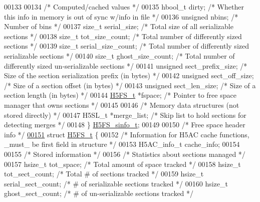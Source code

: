 \begin{DoxyCode}
00133 
00134 \textcolor{comment}{/* Computed/cached values */}
00135     hbool\_t dirty;              \textcolor{comment}{/* Whether this info in memory is out of sync w/info in file */}
00136     \textcolor{keywordtype}{unsigned} nbins;             \textcolor{comment}{/* Number of bins                             */}
00137     \textcolor{keywordtype}{size\_t} serial\_size;         \textcolor{comment}{/* Total size of all serializable sections    */}
00138     \textcolor{keywordtype}{size\_t} tot\_size\_count;      \textcolor{comment}{/* Total number of differently sized sections */}
00139     \textcolor{keywordtype}{size\_t} serial\_size\_count;   \textcolor{comment}{/* Total number of differently sized serializable sections */}
00140     \textcolor{keywordtype}{size\_t} ghost\_size\_count;    \textcolor{comment}{/* Total number of differently sized un-serializable sections */}
00141     \textcolor{keywordtype}{unsigned} sect\_prefix\_size;  \textcolor{comment}{/* Size of the section serialization prefix (in bytes) */}
00142     \textcolor{keywordtype}{unsigned} sect\_off\_size;     \textcolor{comment}{/* Size of a section offset (in bytes)        */}
00143     \textcolor{keywordtype}{unsigned} sect\_len\_size;     \textcolor{comment}{/* Size of a section length (in bytes)        */}
00144     \hyperlink{struct_h5_f_s__t}{H5FS\_t} *fspace;             \textcolor{comment}{/* Pointer to free space manager that owns sections */}
00145 
00146 \textcolor{comment}{/* Memory data structures (not stored directly) */}
00147     H5SL\_t *merge\_list;         \textcolor{comment}{/* Skip list to hold sections for detecting merges */}
00148 \} \hyperlink{struct_h5_f_s__sinfo__t}{H5FS\_sinfo\_t};
00149 
00150 \textcolor{comment}{/* Free space header info */}
\hyperlink{struct_h5_f_s__t}{00151} \textcolor{keyword}{struct }\hyperlink{struct_h5_f_s__t}{H5FS\_t} \{
00152     \textcolor{comment}{/* Information for H5AC cache functions, \_must\_ be first field in structure */}
00153     H5AC\_info\_t cache\_info;
00154 
00155 \textcolor{comment}{/* Stored information */}
00156     \textcolor{comment}{/* Statistics about sections managed */}
00157     hsize\_t tot\_space;          \textcolor{comment}{/* Total amount of space tracked              */}
00158     hsize\_t tot\_sect\_count;     \textcolor{comment}{/* Total # of sections tracked                */}
00159     hsize\_t serial\_sect\_count;  \textcolor{comment}{/* # of serializable sections tracked         */}
00160     hsize\_t ghost\_sect\_count;   \textcolor{comment}{/* # of un-serializable sections tracked      */}

\end{DoxyCode}
